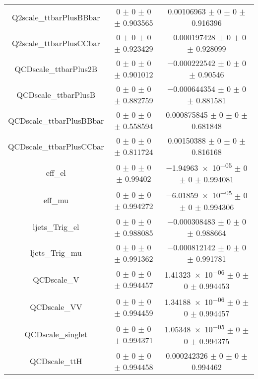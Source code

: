 \begin{table}
\begin{tabular}{ccc}
Q2scale\_ttbarPlusBBbar & \num{0} $\pm$ \num{0} $\pm$ \num{0} $\pm$ \num{0.903565} & \num{0.00106963} $\pm$ \num{0} $\pm$ \num{0} $\pm$ \num{0.916396}\\
Q2scale\_ttbarPlusCCbar & \num{0} $\pm$ \num{0} $\pm$ \num{0} $\pm$ \num{0.923429} & \num{-0.000197428} $\pm$ \num{0} $\pm$ \num{0} $\pm$ \num{0.928099}\\
QCDscale\_ttbarPlus2B & \num{0} $\pm$ \num{0} $\pm$ \num{0} $\pm$ \num{0.901012} & \num{-0.000222542} $\pm$ \num{0} $\pm$ \num{0} $\pm$ \num{0.90546}\\
QCDscale\_ttbarPlusB & \num{0} $\pm$ \num{0} $\pm$ \num{0} $\pm$ \num{0.882759} & \num{-0.000644354} $\pm$ \num{0} $\pm$ \num{0} $\pm$ \num{0.881581}\\
QCDscale\_ttbarPlusBBbar & \num{0} $\pm$ \num{0} $\pm$ \num{0} $\pm$ \num{0.558594} & \num{0.000875845} $\pm$ \num{0} $\pm$ \num{0} $\pm$ \num{0.681848}\\
QCDscale\_ttbarPlusCCbar & \num{0} $\pm$ \num{0} $\pm$ \num{0} $\pm$ \num{0.811724} & \num{0.00150388} $\pm$ \num{0} $\pm$ \num{0} $\pm$ \num{0.816168}\\
eff\_el & \num{0} $\pm$ \num{0} $\pm$ \num{0} $\pm$ \num{0.99402} & \num{-1.94963e-05} $\pm$ \num{0} $\pm$ \num{0} $\pm$ \num{0.994081}\\
eff\_mu & \num{0} $\pm$ \num{0} $\pm$ \num{0} $\pm$ \num{0.994272} & \num{-6.01859e-05} $\pm$ \num{0} $\pm$ \num{0} $\pm$ \num{0.994306}\\
ljets\_Trig\_el & \num{0} $\pm$ \num{0} $\pm$ \num{0} $\pm$ \num{0.988085} & \num{-0.000308483} $\pm$ \num{0} $\pm$ \num{0} $\pm$ \num{0.988664}\\
ljets\_Trig\_mu & \num{0} $\pm$ \num{0} $\pm$ \num{0} $\pm$ \num{0.991362} & \num{-0.000812142} $\pm$ \num{0} $\pm$ \num{0} $\pm$ \num{0.991781}\\
QCDscale\_V & \num{0} $\pm$ \num{0} $\pm$ \num{0} $\pm$ \num{0.994457} & \num{1.41323e-06} $\pm$ \num{0} $\pm$ \num{0} $\pm$ \num{0.994453}\\
QCDscale\_VV & \num{0} $\pm$ \num{0} $\pm$ \num{0} $\pm$ \num{0.994459} & \num{1.34188e-06} $\pm$ \num{0} $\pm$ \num{0} $\pm$ \num{0.994457}\\
QCDscale\_singlet & \num{0} $\pm$ \num{0} $\pm$ \num{0} $\pm$ \num{0.994371} & \num{1.05348e-05} $\pm$ \num{0} $\pm$ \num{0} $\pm$ \num{0.994375}\\
QCDscale\_ttH & \num{0} $\pm$ \num{0} $\pm$ \num{0} $\pm$ \num{0.994458} & \num{0.000242326} $\pm$ \num{0} $\pm$ \num{0} $\pm$ \num{0.994462}\\

\end{tabular}
\end{table}
